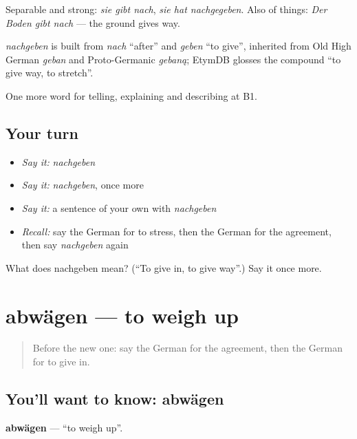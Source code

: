 Separable and strong: \emph{sie gibt nach}, \emph{sie hat nachgegeben}. Also of things: \emph{Der Boden gibt nach} — the ground gives way.

\begin{cousinweb}
\emph{nachgeben} is built from \emph{nach} \textquotedblleft{}after\textquotedblright{} and \emph{geben} \textquotedblleft{}to give\textquotedblright{}, inherited from Old High German \emph{geban} and Proto-Germanic \emph{gebaną}; EtymDB glosses the compound \textquotedblleft{}to give way, to stretch\textquotedblright{}.
\end{cousinweb}

\begin{grammarlens}[title={What you've built}]
One more word for telling, explaining and describing at B1.
\end{grammarlens}

\subsection*{Your turn}
\begin{itemize}
\raggedright
  \item \emph{Say it:} \emph{nachgeben}
  \item \emph{Say it:} \emph{nachgeben}, once more
  \item \emph{Say it:} a sentence of your own with \emph{nachgeben}
  \item \emph{Recall:} say the German for to stress, then the German for the agreement, then say \emph{nachgeben} again
\end{itemize}

\begin{tcolorbox}[breakable,colback=teal!4,colframe=teal!35!black,title={Before you move on}]
What does nachgeben mean? (\textquotedblleft{}To give in, to give way\textquotedblright{}.) Say it once more.
\end{tcolorbox}
\section[abwägen]{abwägen — to weigh up}

\label{lesson:GE-C336-abwaegen}



\begin{quote}
Before the new one: say the German for the agreement, then the German for to give in.
\end{quote}

\subsection*{You'll want to know: abwägen}
\textbf{abwägen} — \textquotedblleft{}to weigh up\textquotedblright{}.

